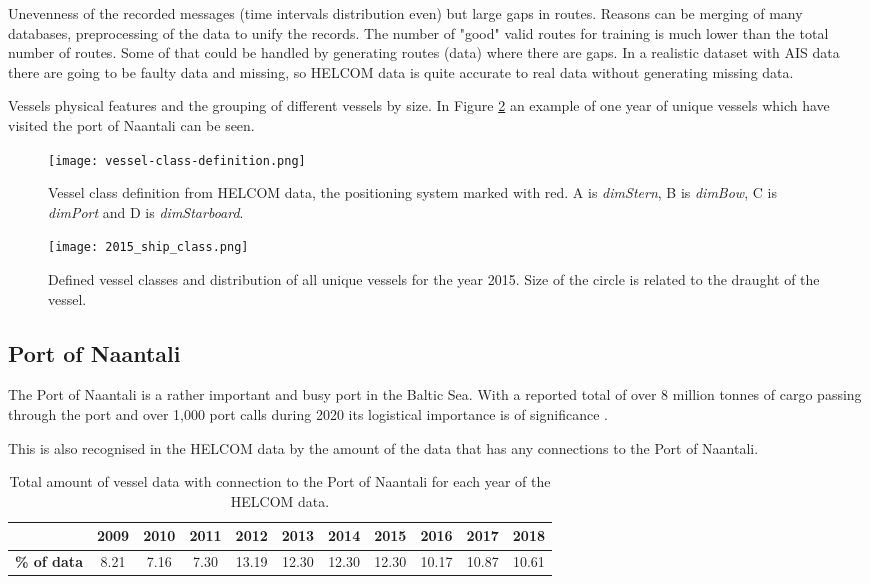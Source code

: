 \documentclass[../main.tex]{subfiles}
\begin{document}
Unevenness of the recorded messages (time intervals distribution even) but large gaps in routes. Reasons can be merging of many databases, preprocessing of the data to unify the records. The number of "good" valid routes for training is much lower than the total number of routes. Some of that could be handled by generating routes (data) where there are gaps. In a realistic dataset with AIS data there are going to be faulty data and missing, so HELCOM data is quite accurate to real data without generating missing data.



Vessels physical features and the grouping of different vessels by size. In Figure \ref{fig:vessel-classes} an example of one year of unique vessels which have visited the port of Naantali can be seen. 

\begin{figure}[H]
\centering
\texttt{[image: vessel-class-definition.png]}
\caption{Vessel class definition from HELCOM data, the positioning system marked with red. A is \textit{dimStern}, B is \textit{dimBow}, C is \textit{dimPort} and D is \textit{dimStarboard}.}
\label{fig:vessel-class-def}
\end{figure}

\begin{figure}[H]
\centering
\texttt{[image: 2015\_ship\_class.png]}
\caption{Defined vessel classes and distribution of all unique vessels for the year 2015. Size of the circle is related to the draught of the vessel.}
\label{fig:vessel-classes}
\end{figure}

\subsection{Port of Naantali}

The Port of Naantali is a rather important and busy port in the Baltic Sea. With a reported total of over 8 million tonnes of cargo passing through the port and over 1,000 port calls during 2020 its logistical importance is of significance \cite{PoN_2021}. 

This is also recognised in the HELCOM data by the amount of the data that has any connections to the Port of Naantali.

\begin{table}[H]
\centering
\begin{tabular}{|l|c|c|c|c|c|c|c|c|c|c|}
\hline
\rowcolor[HTML]{C0C0C0} 
\multicolumn{1}{|r|}{\cellcolor[HTML]{C0C0C0}\textbf{Year}} & \textbf{2009} & \textbf{2010} & \textbf{2011} & \textbf{2012} & \textbf{2013} & \textbf{2014} & \textbf{2015} & \textbf{2016} & \textbf{2017} & \textbf{2018} \\ \hline
\textbf{\% of data}                           & 8.21          & 7.16          & 7.30          & 13.19         & 12.30         & 12.30         & 12.30         & 10.17         & 10.87         & 10.61         \\ \hline
\end{tabular}
\caption{Total amount of vessel data with connection to the Port of Naantali for each year of the HELCOM data.}
\label{tab:HELCOM-data-percent}
\end{table}
\end{document}
